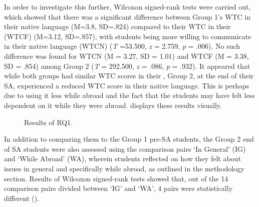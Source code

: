 \documentclass[output=paper]{langsci/langscibook}
\begin{document}
In order to investigate this further, Wilcoxon signed-rank tests were carried out, which showed that there was a significant difference between Group 1’s WTC in their native language (M=3.8, SD=.824) compared to their WTC in their  (WTCF) (M=3.12, SD=.857), with students being more willing to communicate in their native language (WTCN) (\textit{T} =53.500, \textit{z} = 2.759, \textit{p} = .006). No such difference was found for WTCN (M = 3.27, SD = 1.01) and WTCF (M = 3.38, SD = .854) among Group 2 (\textit{T} = 292.500, \textit{z} = .086, \textit{p} = .932). It appeared that while both groups had similar WTC scores in their , Group 2, at the end of their SA, experienced a reduced WTC score in their native language. This is perhaps due to using it less while abroad and the fact that the students may have felt less dependent on it while they were abroad.  displays these results visually.

\begin{figure} 

\caption{{Results of RQ1.}}
\label{fig:geoghegan:graph2}
\end{figure}

\newpage 
In addition to comparing them to the Group 1 pre-SA students, the Group 2 end of SA students were also assessed using the comparison pairs ‘In General’ (IG) and ‘While  {Abroad}’ (WA), wherein students reflected on how they felt about issues in general and specifically while abroad, as outlined in the methodology section. Results of Wilcoxon signed-rank tests showed that, out of the 14 comparison pairs divided between ‘IG’ and ‘WA’, 4 pairs were statistically different (). 
\end{document}
